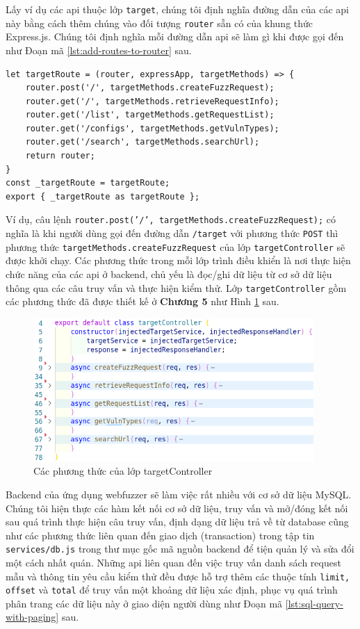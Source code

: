 Lấy ví dụ các \acrshort{api} thuộc lớp \texttt{target}, chúng tôi định nghĩa đường dẫn của các \acrshort{api} này bằng cách thêm chúng vào đối tượng \texttt{router} sẵn có của khung thức Express.js. Chúng tôi định nghĩa mỗi đường dẫn \acrshort{api} sẽ làm gì khi được gọi đến như Đoạn mã \ref{lst:add-routes-to-router} sau.
\begin{lstlisting}[style=ES6, label={lst:add-routes-to-router}, caption={Định nghĩa đường dẫn cho các \acrshort{api} thuộc lớp target}]
let targetRoute = (router, expressApp, targetMethods) => {
    router.post('/', targetMethods.createFuzzRequest);
    router.get('/', targetMethods.retrieveRequestInfo);
    router.get('/list', targetMethods.getRequestList);
    router.get('/configs', targetMethods.getVulnTypes);
    router.get('/search', targetMethods.searchUrl);
    return router;
}
const _targetRoute = targetRoute;
export { _targetRoute as targetRoute };
\end{lstlisting}
Ví dụ, câu lệnh \colorbox{gray!30}{\texttt{router.post('/', targetMethods.createFuzzRequest);}} có nghĩa là khi người dùng gọi đến đường dẫn \texttt{/target} với phương thức \texttt{POST} thì phương thức \texttt{targetMethods.createFuzzRequest} của lớp \texttt{targetController} sẽ được khởi chạy. Các phương thức trong mỗi lớp trình điều khiển là nơi thực hiện chức năng của các \acrshort{api} ở backend, chủ yếu là đọc/ghi dữ liệu từ cơ sở dữ liệu thông qua các câu truy vấn và thực hiện kiểm thử. Lớp \texttt{targetController} gồm các phương thức đã được thiết kế ở \textbf{Chương 5} như Hình \ref{fig:implement-target-controller-class} sau.
\begin{figure}[H]
  \centering
    \includegraphics[width=0.95\textwidth,keepaspectratio=true]{images/implement-target-controller-class.png}
  \caption{Các phương thức của lớp targetController}
  \label{fig:implement-target-controller-class}
\end{figure}
Backend của ứng dụng webfuzzer sẽ làm việc rất nhiều với cơ sở dữ liệu MySQL. Chúng tôi hiện thực các hàm kết nối cơ sở dữ liệu, truy vấn và mở/đóng kết nối sau quá trình thực hiện câu truy vấn, định dạng dữ liệu trả về từ database cũng như các phương thức liên quan đến giao dịch (transaction) trong tập tin \texttt{services/db.js} trong thư mục gốc mã nguồn backend để tiện quản lý và sửa đổi một cách nhất quán. Những \acrshort{api} liên quan đến việc truy vấn danh sách request mẫu và thông tin yêu cầu kiểm thử đều được hỗ trợ thêm các thuộc tính \texttt{limit, offset} và \texttt{total} để truy vấn một khoảng dữ liệu xác định, phục vụ quá trình phân trang các dữ liệu này ở giao diện người dùng như Đoạn mã \ref{lst:sql-query-with-paging} sau.
